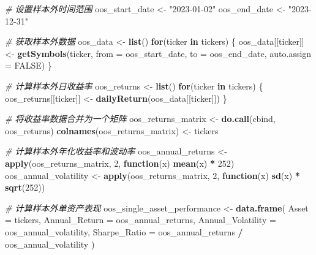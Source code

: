 \documentclass[
]{article}
\newenvironment{Shaded}{\begin{snugshade}}{\end{snugshade}}
\newcommand{\AttributeTok}[1]{\textcolor[rgb]{0.13,0.29,0.53}{#1}}
\newcommand{\CommentTok}[1]{\textcolor[rgb]{0.56,0.35,0.01}{\textit{#1}}}
\newcommand{\ConstantTok}[1]{\textcolor[rgb]{0.56,0.35,0.01}{#1}}
\newcommand{\ControlFlowTok}[1]{\textcolor[rgb]{0.13,0.29,0.53}{\textbf{#1}}}
\newcommand{\DecValTok}[1]{\textcolor[rgb]{0.00,0.00,0.81}{#1}}
\newcommand{\FunctionTok}[1]{\textcolor[rgb]{0.13,0.29,0.53}{\textbf{#1}}}
\newcommand{\NormalTok}[1]{#1}
\newcommand{\OtherTok}[1]{\textcolor[rgb]{0.56,0.35,0.01}{#1}}
\newcommand{\SpecialCharTok}[1]{\textcolor[rgb]{0.81,0.36,0.00}{\textbf{#1}}}
\newcommand{\StringTok}[1]{\textcolor[rgb]{0.31,0.60,0.02}{#1}}
\begin{document}
\begin{Shaded}
\begin{Highlighting}[]
\CommentTok{\# 设置样本外时间范围}
\NormalTok{oos\_start\_date }\OtherTok{\textless{}{-}} \StringTok{"2023{-}01{-}02"}
\NormalTok{oos\_end\_date }\OtherTok{\textless{}{-}} \StringTok{"2023{-}12{-}31"}

\CommentTok{\# 获取样本外数据}
\NormalTok{oos\_data }\OtherTok{\textless{}{-}} \FunctionTok{list}\NormalTok{()}
\ControlFlowTok{for}\NormalTok{(ticker }\ControlFlowTok{in}\NormalTok{ tickers) \{}
\NormalTok{  oos\_data[[ticker]] }\OtherTok{\textless{}{-}} \FunctionTok{getSymbols}\NormalTok{(ticker, }\AttributeTok{from =}\NormalTok{ oos\_start\_date, }\AttributeTok{to =}\NormalTok{ oos\_end\_date, }\AttributeTok{auto.assign =} \ConstantTok{FALSE}\NormalTok{)}
\NormalTok{\}}

\CommentTok{\# 计算样本外日收益率}
\NormalTok{oos\_returns }\OtherTok{\textless{}{-}} \FunctionTok{list}\NormalTok{()}
\ControlFlowTok{for}\NormalTok{(ticker }\ControlFlowTok{in}\NormalTok{ tickers) \{}
\NormalTok{  oos\_returns[[ticker]] }\OtherTok{\textless{}{-}} \FunctionTok{dailyReturn}\NormalTok{(oos\_data[[ticker]])}
\NormalTok{\}}

\CommentTok{\# 将收益率数据合并为一个矩阵}
\NormalTok{oos\_returns\_matrix }\OtherTok{\textless{}{-}} \FunctionTok{do.call}\NormalTok{(cbind, oos\_returns)}
\FunctionTok{colnames}\NormalTok{(oos\_returns\_matrix) }\OtherTok{\textless{}{-}}\NormalTok{ tickers}

\CommentTok{\# 计算样本外年化收益率和波动率}
\NormalTok{oos\_annual\_returns }\OtherTok{\textless{}{-}} \FunctionTok{apply}\NormalTok{(oos\_returns\_matrix, }\DecValTok{2}\NormalTok{, }\ControlFlowTok{function}\NormalTok{(x) }\FunctionTok{mean}\NormalTok{(x) }\SpecialCharTok{*} \DecValTok{252}\NormalTok{)}
\NormalTok{oos\_annual\_volatility }\OtherTok{\textless{}{-}} \FunctionTok{apply}\NormalTok{(oos\_returns\_matrix, }\DecValTok{2}\NormalTok{, }\ControlFlowTok{function}\NormalTok{(x) }\FunctionTok{sd}\NormalTok{(x) }\SpecialCharTok{*} \FunctionTok{sqrt}\NormalTok{(}\DecValTok{252}\NormalTok{))}

\CommentTok{\# 计算样本外单资产表现}
\NormalTok{oos\_single\_asset\_performance }\OtherTok{\textless{}{-}} \FunctionTok{data.frame}\NormalTok{(}
  \AttributeTok{Asset =}\NormalTok{ tickers,}
  \AttributeTok{Annual\_Return =}\NormalTok{ oos\_annual\_returns,}
  \AttributeTok{Annual\_Volatility =}\NormalTok{ oos\_annual\_volatility,}
  \AttributeTok{Sharpe\_Ratio =}\NormalTok{ oos\_annual\_returns }\SpecialCharTok{/}\NormalTok{ oos\_annual\_volatility}
\NormalTok{)}


\end{Highlighting}
\end{Shaded}
\end{document}

